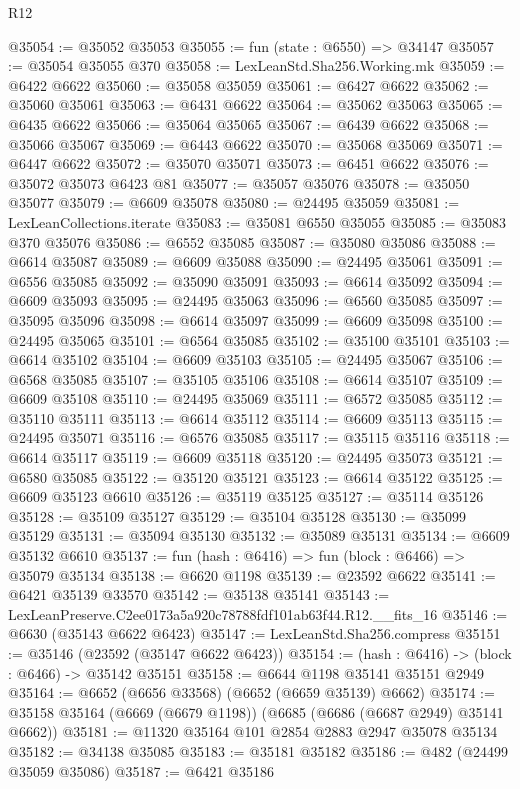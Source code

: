 \begin{lexlean}{R12}
\begin{coremodule}
@35054 := @35052 @35053
@35055 := fun (state : @6550) => @34147
@35057 := @35054 @35055 @370
@35058 := LexLeanStd.Sha256.Working.mk
@35059 := @6422 @6622
@35060 := @35058 @35059
@35061 := @6427 @6622
@35062 := @35060 @35061
@35063 := @6431 @6622
@35064 := @35062 @35063
@35065 := @6435 @6622
@35066 := @35064 @35065
@35067 := @6439 @6622
@35068 := @35066 @35067
@35069 := @6443 @6622
@35070 := @35068 @35069
@35071 := @6447 @6622
@35072 := @35070 @35071
@35073 := @6451 @6622
@35076 := @35072 @35073 @6423 @81
@35077 := @35057 @35076
@35078 := @35050 @35077
@35079 := @6609 @35078
@35080 := @24495 @35059
@35081 := LexLeanCollections.iterate
@35083 := @35081 @6550 @35055
@35085 := @35083 @370 @35076
@35086 := @6552 @35085
@35087 := @35080 @35086
@35088 := @6614 @35087
@35089 := @6609 @35088
@35090 := @24495 @35061
@35091 := @6556 @35085
@35092 := @35090 @35091
@35093 := @6614 @35092
@35094 := @6609 @35093
@35095 := @24495 @35063
@35096 := @6560 @35085
@35097 := @35095 @35096
@35098 := @6614 @35097
@35099 := @6609 @35098
@35100 := @24495 @35065
@35101 := @6564 @35085
@35102 := @35100 @35101
@35103 := @6614 @35102
@35104 := @6609 @35103
@35105 := @24495 @35067
@35106 := @6568 @35085
@35107 := @35105 @35106
@35108 := @6614 @35107
@35109 := @6609 @35108
@35110 := @24495 @35069
@35111 := @6572 @35085
@35112 := @35110 @35111
@35113 := @6614 @35112
@35114 := @6609 @35113
@35115 := @24495 @35071
@35116 := @6576 @35085
@35117 := @35115 @35116
@35118 := @6614 @35117
@35119 := @6609 @35118
@35120 := @24495 @35073
@35121 := @6580 @35085
@35122 := @35120 @35121
@35123 := @6614 @35122
@35125 := @6609 @35123 @6610
@35126 := @35119 @35125
@35127 := @35114 @35126
@35128 := @35109 @35127
@35129 := @35104 @35128
@35130 := @35099 @35129
@35131 := @35094 @35130
@35132 := @35089 @35131
@35134 := @6609 @35132 @6610
@35137 := fun (hash : @6416) => fun (block : @6466) => @35079 @35134
@35138 := @6620 @1198
@35139 := @23592 @6622
@35141 := @6421 @35139 @33570
@35142 := @35138 @35141
@35143 := LexLeanPreserve.C2ee0173a5a920c78788fdf101ab63f44.R12.__fits_16
@35146 := @6630 (@35143 @6622 @6423)
@35147 := LexLeanStd.Sha256.compress
@35151 := @35146 (@23592 (@35147 @6622 @6423))
@35154 := (hash : @6416) -> (block : @6466) -> @35142 @35151
@35158 := @6644 @1198 @35141 @35151 @2949
@35164 := @6652 (@6656 @33568) (@6652 (@6659 @35139) @6662)
@35174 := @35158 @35164 (@6669 (@6679 @1198)) (@6685 (@6686 (@6687 @2949) @35141 @6662))
@35181 := @11320 @35164 @101 @2854 @2883 @2947 @35078 @35134
@35182 := @34138 @35085
@35183 := @35181 @35182
@35186 := @482 (@24499 @35059 @35086)
@35187 := @6421 @35186

\end{coremodule}
\end{lexlean}
